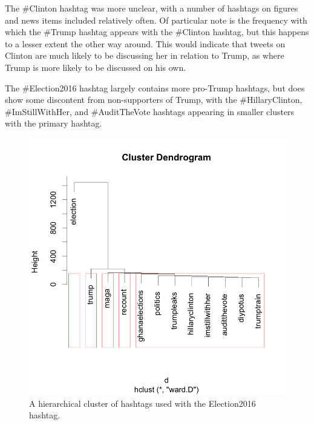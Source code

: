 \documentclass[prodmode]{acmsmall} %
\begin{document}
The \#Clinton hashtag was more unclear, with a number of hashtags on figures and
news items included relatively often. Of particular note is the frequency with
which the \#Trump hashtag appears with the \#Clinton hashtag, but this happens
to a lesser extent the other way around. This would indicate that tweets on
Clinton are much likely to be discussing her in relation to Trump, as where
Trump is more likely to be discussed on his own.

The \#Election2016 hashtag largely contains more pro-Trump hashtags, but does
show some discontent from non-supporters of Trump, with the \#HillaryClinton,
\#ImStillWithHer, and \#AuditTheVote hashtags appearing in smaller clusters
with the primary hashtag.

\begin{figure}
\centering
\begin{minipage}[b]{.49\textwidth}
    \includegraphics[width = \textwidth]{cluster-election2016}
\caption{A hierarchical cluster of hashtags used with the Election2016 hashtag.}
\label{election2016 cluster}
\end{minipage}\hfill
\begin{minipage}[b]{.49\textwidth}

\end{minipage}
\end{figure}
\end{document}
